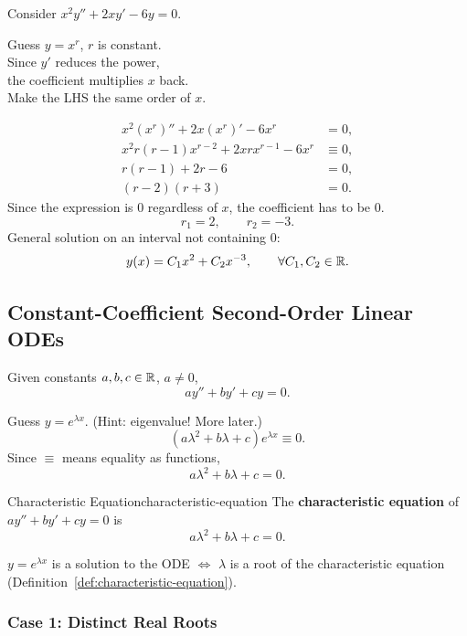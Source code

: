 \begin{example}
  Consider $x^2y''+2xy'-6y=0$.

  \begin{thinking}
    Guess $y=x^r$, $r$ is constant.\\
    Since $y'$ reduces the power,\\
    the coefficient multiplies $x$ back.\\
    Make the LHS the same order of $x$.
  \end{thinking}

  \begin{align*}
    x^2(x^r)''+2x(x^r)'-6x^r         & =0,      \\
    x^2r(r-1)x^{r-2}+2xrx^{r-1}-6x^r & \equiv0, \\
    r(r-1)+2r-6                      & =0,      \\
    (r-2)(r+3)                       & =0.
  \end{align*}
  Since the expression is $0$ regardless of $x$, the coefficient has to be $0$.
  \[
    r_1=2,\qquad r_2=-3.
  \]
  General solution on an interval not containing $0$:
  \[
    y(x)=C_1x^2+C_2x^{-3},\qquad \forall C_1,C_2\in\mathbb{R}.
  \]
\end{example}

\subsection{Constant-Coefficient Second-Order Linear ODEs}

Given constants $a,b,c\in\mathbb{R}$, $a\ne0$,
\[
  ay''+by'+cy=0.
\]
\begin{thinking}
  Guess $y=e^{\lambda x}$. (Hint: eigenvalue! More later.)
  \[
    (a\lambda^2+b\lambda+c)e^{\lambda x}\equiv0.
  \]
  Since $\equiv$ means equality as functions,
  \[
    a\lambda^2+b\lambda+c=0.
  \]
\end{thinking}

\begin{definition}{Characteristic Equation}{characteristic-equation}
  The \textbf{characteristic equation} of $ay''+by'+cy=0$ is
  \[
    a\lambda^2+b\lambda+c=0.
  \]
\end{definition}

$y=e^{\lambda x}$ is a solution to the ODE $\Longleftrightarrow$
$\lambda$ is a root of the characteristic equation
(Definition~\ref{def:characteristic-equation}).

\subsubsection{Case 1: Distinct Real Roots}

